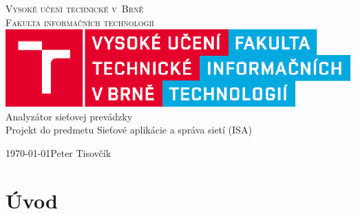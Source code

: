 \documentclass[10pt,a4paper,final]{article}
\begin{document}
\thispagestyle{empty}

\begin{center}
	\Huge \textsc{Vysoké učení technické v~Brně}\\
	\huge \textsc{Fakulta informačních technologií}\\
	\includegraphics[keepaspectratio]{images/fit.eps}\\
	\Huge Analyzátor sieťovej prevádzky\\[5mm]
	\Large Projekt do predmetu Sieťové aplikácie a správa sietí (ISA)\\
\end{center}
{\large \today \hfill Peter Tisovčík}
\newpage

\pagestyle{plain}
\setcounter{page}{1}

\tableofcontents
\newpage

\section{Úvod} \label{sec:uvod}
\end{document}
